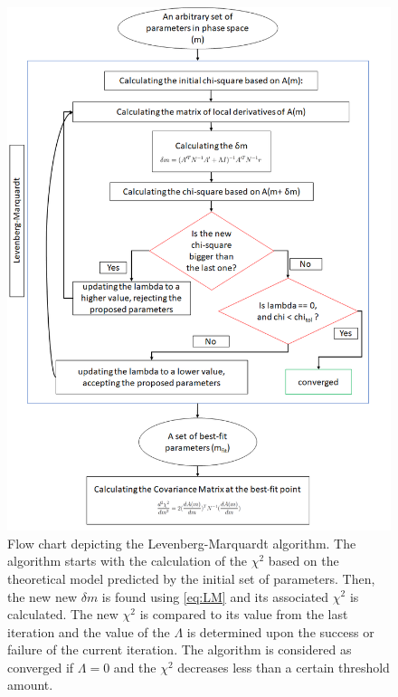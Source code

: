 \documentclass[12pt, TexShade, letterpaper]{report}
\begin{document}
\begin{figure}[h!]
\centering
\includegraphics[scale =0.75]{LM_flow.png}
\caption[Flow chart of LM]{Flow chart depicting the Levenberg-Marquardt algorithm. The algorithm starts with the calculation of the $\chi^2$ based on the theoretical model predicted by the initial set of parameters. Then, the new new $\delta m$ is found using \ref{eq:LM} and its associated $\chi^2$ is calculated. The new $\chi^2$ is compared to its value from the last iteration and the value of the $\Lambda$ is determined upon the success or failure of the current iteration. The algorithm is considered as converged if $\Lambda = 0$ and the $\chi^2$ decreases less than a certain threshold amount.}
\label{fig:LM_flow}
\end{figure}
\end{document}
